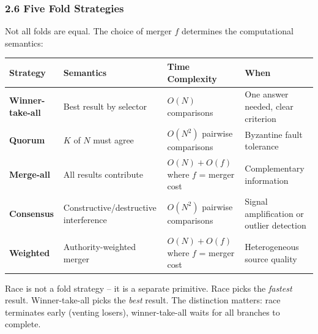 \documentclass[
  11pt,
]{article}
\newcounter{none} %
\begin{document}
\subsubsection{2.6 Five Fold Strategies}\label{five-fold-strategies}

Not all folds are equal. The choice of merger \(f\) determines the
computational semantics:

{\def\LTcaptype{none} %
\begin{longtable}[]{@{}
  >{\raggedright\arraybackslash}p{}
  >{\raggedright\arraybackslash}p{}
  >{\raggedright\arraybackslash}p{}
  >{\raggedright\arraybackslash}p{}@{}}
\toprule\noalign{}
\begin{minipage}[b]{\linewidth}\raggedright
Strategy
\end{minipage} & \begin{minipage}[b]{\linewidth}\raggedright
Semantics
\end{minipage} & \begin{minipage}[b]{\linewidth}\raggedright
Time Complexity
\end{minipage} & \begin{minipage}[b]{\linewidth}\raggedright
When
\end{minipage} \\
\midrule\noalign{}
\endhead
\bottomrule\noalign{}
\endlastfoot
\textbf{Winner-take-all} & Best result by selector & \(O(N)\)
comparisons & One answer needed, clear criterion \\
\textbf{Quorum} & \(K\) of \(N\) must agree & \(O(N^2)\) pairwise
comparisons & Byzantine fault tolerance \\
\textbf{Merge-all} & All results contribute & \(O(N) + O(f)\) where
\(f\) = merger cost & Complementary information \\
\textbf{Consensus} & Constructive/destructive interference & \(O(N^2)\)
pairwise comparisons & Signal amplification or outlier detection \\
\textbf{Weighted} & Authority-weighted merger & \(O(N) + O(f)\) where
\(f\) = merger cost & Heterogeneous source quality \\
\end{longtable}
}

Race is not a fold strategy -- it is a separate primitive. Race picks
the \emph{fastest} result. Winner-take-all picks the \emph{best} result.
The distinction matters: race terminates early (venting losers),
winner-take-all waits for all branches to complete.
\end{document}

